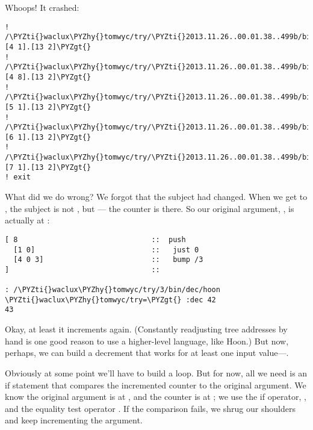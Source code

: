Whoops!  It crashed:

\begin{framed_shaded}
\begin{Verbatim}[fontsize=\relsize{-2.5},fontseries=b,commandchars=\\\{\}]
! /\PYZti{}waclux\PYZhy{}tomwyc/try/\PYZti{}2013.11.26..00.01.38..499b/bin/dec/:\PYZlt{}[4 1].[13 2]\PYZgt{}
! /\PYZti{}waclux\PYZhy{}tomwyc/try/\PYZti{}2013.11.26..00.01.38..499b/bin/dec/:\PYZlt{}[4 8].[13 2]\PYZgt{}
! /\PYZti{}waclux\PYZhy{}tomwyc/try/\PYZti{}2013.11.26..00.01.38..499b/bin/dec/:\PYZlt{}[5 1].[13 2]\PYZgt{}
! /\PYZti{}waclux\PYZhy{}tomwyc/try/\PYZti{}2013.11.26..00.01.38..499b/bin/dec/:\PYZlt{}[6 1].[13 2]\PYZgt{}
! /\PYZti{}waclux\PYZhy{}tomwyc/try/\PYZti{}2013.11.26..00.01.38..499b/bin/dec/:\PYZlt{}[7 1].[13 2]\PYZgt{}
! exit
\end{Verbatim}
\end{framed_shaded}

What did we do wrong?  We forgot that the subject had changed.
When we get to \kode{[4 0 1]}, the subject is not , but \kode{[0 42]}---
the counter is there.  So our original argument, , is
actually at :

\begin{framed_shaded}
\begin{Verbatim}[fontsize=\relsize{-2.5},fontseries=b,commandchars=\\\{\}]
[ 8                               ::  push
  [1 0]                           ::   just 0
  [4 0 3]                         ::   bump /3
]                                 ::

: /\PYZti{}waclux\PYZhy{}tomwyc/try/3/bin/dec/hoon
\PYZti{}waclux\PYZhy{}tomwyc/try=\PYZgt{} :dec 42
43
\end{Verbatim}
\end{framed_shaded}

Okay, at least it increments again.  (Constantly readjusting tree
addresses by hand is one good reason to use a higher-level
language, like Hoon.) But now, perhaps, we can build a decrement
that works for at least one input value---.

Obviously at some point we'll have to build a loop.  But for now,
all we need is an if statement that compares the incremented
counter to the original argument.  We know the original argument
is at , and the counter is at ; we use the if operator,
, and the equality test operator .  If the comparison
fails, we shrug our shoulders and keep incrementing the argument.

